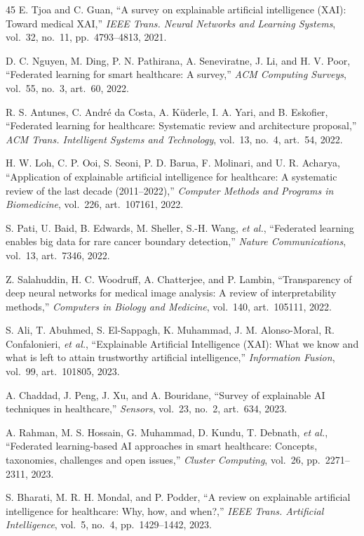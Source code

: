 \documentclass[11pt,a4paper]{article}
\begin{document}
\begin{thebibliography}{45}
 E. Tjoa and C. Guan, ``A survey on explainable artificial
intelligence (XAI): Toward medical XAI,'' \emph{IEEE Trans. Neural Networks and
Learning Systems}, vol.~32, no.~11, pp.~4793--4813, 2021.

 D. C. Nguyen, M. Ding, P. N. Pathirana, A. Seneviratne, J. Li,
and H. V. Poor, ``Federated learning for smart healthcare: A survey,'' \emph{ACM
Computing Surveys}, vol.~55, no.~3, art.~60, 2022.

 R. S. Antunes, C. Andr\'e da Costa, A. K\"uderle, I. A. Yari, and
B. Eskofier, ``Federated learning for healthcare: Systematic review and
architecture proposal,'' \emph{ACM Trans. Intelligent Systems and Technology},
vol.~13, no.~4, art.~54, 2022.

 H. W. Loh, C. P. Ooi, S. Seoni, P. D. Barua, F. Molinari, and
U. R. Acharya, ``Application of explainable artificial intelligence for
healthcare: A systematic review of the last decade (2011--2022),''
\emph{Computer Methods and Programs in Biomedicine}, vol.~226, art.~107161,
2022.

 S. Pati, U. Baid, B. Edwards, M. Sheller, S.-H. Wang,
\emph{et al.}, ``Federated learning enables big data for rare cancer boundary
detection,'' \emph{Nature Communications}, vol.~13, art.~7346, 2022.

 Z. Salahuddin, H. C. Woodruff, A. Chatterjee, and P. Lambin,
``Transparency of deep neural networks for medical image analysis: A review of
interpretability methods,'' \emph{Computers in Biology and Medicine}, vol.~140,
art.~105111, 2022.

 S. Ali, T. Abuhmed, S. El-Sappagh, K. Muhammad, J. M. Alonso-Moral,
R. Confalonieri, \emph{et al.}, ``Explainable Artificial Intelligence (XAI):
What we know and what is left to attain trustworthy artificial intelligence,''
\emph{Information Fusion}, vol.~99, art.~101805, 2023.

 A. Chaddad, J. Peng, J. Xu, and A. Bouridane, ``Survey of
explainable AI techniques in healthcare,'' \emph{Sensors}, vol.~23, no.~2,
art.~634, 2023.

 A. Rahman, M. S. Hossain, G. Muhammad, D. Kundu, T. Debnath,
\emph{et al.}, ``Federated learning-based AI approaches in smart healthcare:
Concepts, taxonomies, challenges and open issues,'' \emph{Cluster Computing},
vol.~26, pp.~2271--2311, 2023.

 S. Bharati, M. R. H. Mondal, and P. Podder, ``A review on
explainable artificial intelligence for healthcare: Why, how, and when?,''
\emph{IEEE Trans. Artificial Intelligence}, vol.~5, no.~4, pp.~1429--1442, 2023.


\end{thebibliography}
\end{document}

